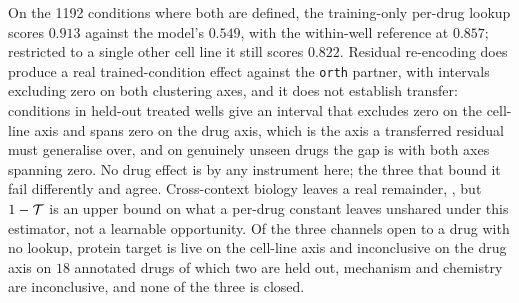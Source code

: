 \begin{claim}
On the \num{1192} conditions where both are defined, the training-only per-drug
lookup scores $0.913$ against the model's $0.549$, with the within-well
reference at $0.857$; restricted to a single other cell line it still scores
$0.822$. Residual re-encoding does produce a real trained-condition effect
against the \texttt{orth} partner, with intervals excluding zero on both
clustering axes, and it does not establish transfer: conditions in held-out
treated wells give an interval that excludes zero on the cell-line axis and
spans zero on the drug axis, which is the axis a transferred residual must
generalise over, and on genuinely unseen drugs the gap is
with both axes spanning zero. No drug effect is \shownzero by any instrument
here; the three that bound it fail differently and agree. Cross-context biology
leaves a real remainder, , but $1-\mathcal{T}$ is an
upper bound on what a per-drug constant leaves unshared under this estimator,
not a learnable opportunity. Of the three channels open to a drug with no
lookup, protein target is live on the cell-line axis and inconclusive on the
drug axis on $18$ annotated drugs of which two are held out, mechanism and
chemistry are inconclusive, and none of the three is closed.
\end{claim}
